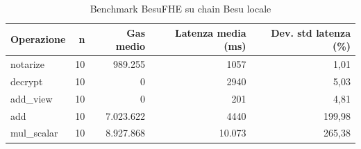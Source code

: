 \begin{table}[H]
\centering
\caption{Benchmark BesuFHE su chain Besu locale}
\label{tab:besufhe-local-benchmark}
\begin{tabular}{lrrrr}
\hline
\textbf{Operazione} & \textbf{n} & \textbf{Gas medio} & \textbf{Latenza media (ms)} & \textbf{Dev. std latenza (\%)} \\
\hline
notarize & 10 & 989.255 & 1057 & 1,01 \\
decrypt & 10 & 0 & 2940 & 5,03 \\
add\_view & 10 & 0 & 201 & 4,81 \\
add & 10 & 7.023.622 & 4440 & 199,98 \\
mul\_scalar & 10 & 8.927.868 & 10.073 & 265,38 \\
\hline
\end{tabular}
\end{table}
\vspace{4pt}

